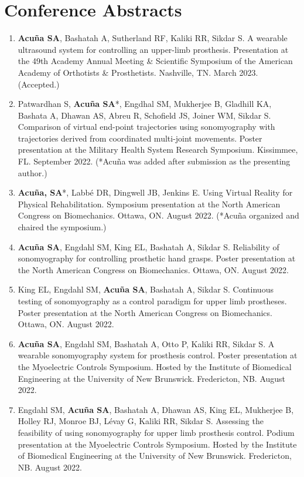 \documentclass[letterpaper, 10pt]{article}
\begin{document}
\section{Conference Abstracts}
\begin{enumerate}
    \item \textbf{Acuña SA}, Bashatah A, Sutherland RF, Kaliki RR, Sikdar S. A wearable ultrasound system for controlling an upper-limb prosthesis. Presentation at the 49th Academy Annual Meeting \& Scientiﬁc Symposium of the American Academy of Orthotists \& Prosthetists. Nashville, TN. March 2023. (Accepted.)
    \item Patwardhan S, \textbf{Acuña SA}*, Engdhal SM, Mukherjee B, Gladhill KA, Bashata A, Dhawan AS, Abreu R, Schofield JS, Joiner WM,  Sikdar S. Comparison of virtual end-point trajectories using sonomyography with trajectories derived from coordinated multi-joint movements. Poster presentation at the Military Health System Research Symposium. Kissimmee, FL. September 2022. (*Acuña was added after submission as the presenting author.)
    \item \textbf{Acuña, SA}*, Labbé DR, Dingwell JB, Jenkins E. Using Virtual Reality for Physical Rehabilitation. Symposium presentation at the North American Congress on Biomechanics. Ottawa, ON. August 2022. (*Acuña organized and chaired the symposium.)
    \item \textbf{Acuña SA}, Engdahl SM, King EL, Bashatah A, Sikdar S. Reliability of sonomyography for controlling prosthetic hand grasps. Poster presentation at the North American Congress on Biomechanics. Ottawa, ON. August 2022.
    \item King EL, Engdahl SM, \textbf{Acuña SA}, Bashatah A, Sikdar S. Continuous testing of sonomyography as a control paradigm for upper limb prostheses. Poster presentation at the North American Congress on Biomechanics. Ottawa, ON. August 2022.
    \item \textbf{Acuña SA}, Engdahl SM, Bashatah A, Otto P, Kaliki RR, Sikdar S. A wearable sonomyography system for prosthesis control. Poster presentation at the Myoelectric Controls Symposium. Hosted by the Institute of Biomedical Engineering at the University of New Brunswick. Fredericton, NB. August 2022.
    \item Engdahl SM, \textbf{Acuña SA}, Bashatah A, Dhawan AS, King EL, Mukherjee B, Holley RJ, Monroe BJ, Lévay G, Kaliki RR, Sikdar S. Assessing the feasibility of using sonomyography for upper limb prosthesis control. Podium presentation at the Myoelectric Controls Symposium. Hosted by the Institute of Biomedical Engineering at the University of New Brunswick. Fredericton, NB. August 2022.

\end{enumerate}
\end{document}
